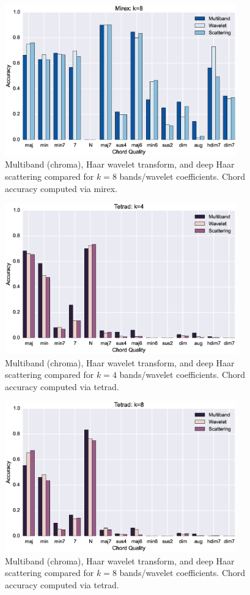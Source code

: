 \documentclass{article}
\begin{document}
\begin{figure}
 \centerline{
 \includegraphics[width=10cm]{figs/mirex8.eps}}
 \caption{Multiband (chroma), Haar wavelet transform, and deep Haar scattering compared for $k=8$ bands/wavelet coefficients. Chord accuracy computed via mirex.}
 \label{fig:mirex8}
\end{figure}


\begin{figure}
 \centerline{
 \includegraphics[width=10cm]{figs/tetrad4.eps}}
 \caption{Multiband (chroma), Haar wavelet transform, and deep Haar scattering compared for $k=4$ bands/wavelet coefficients. Chord accuracy computed via tetrad.}
 \label{fig:tetrad4}
\end{figure}

\begin{figure}
 \centerline{
 \includegraphics[width=10cm]{figs/tetrad8.eps}}
 \caption{Multiband (chroma), Haar wavelet transform, and deep Haar scattering compared for $k=8$ bands/wavelet coefficients. Chord accuracy computed via tetrad.}
 \label{fig:tetrad8}
\end{figure}
\end{document}
